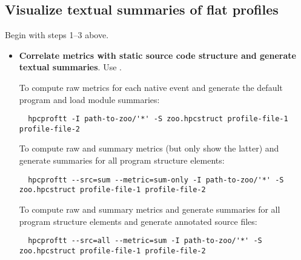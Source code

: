 \documentclass[english]{article}
\begin{document}
\subsection{Visualize textual summaries of flat profiles}

Begin with steps 1--3 above.

\begin{itemize}

\item \textbf{Correlate metrics with static source code structure and generate textual summaries}.
Use .

To compute raw metrics for each native event and generate the default program and load module summaries:
\begin{verbatim}
  hpcproftt -I path-to-zoo/'*' -S zoo.hpcstruct profile-file-1 profile-file-2
\end{verbatim}

To compute raw and summary metrics (but only show the latter) and generate summaries for all program structure elements:
\begin{verbatim}
  hpcproftt --src=sum --metric=sum-only -I path-to-zoo/'*' -S zoo.hpcstruct profile-file-1 profile-file-2
\end{verbatim}

To compute raw and summary metrics and generate summaries for all program structure elements and generate annotated source files:
\begin{verbatim}
  hpcproftt --src=all --metric=sum -I path-to-zoo/'*' -S zoo.hpcstruct profile-file-1 profile-file-2
\end{verbatim}

\end{itemize}




\end{document}
